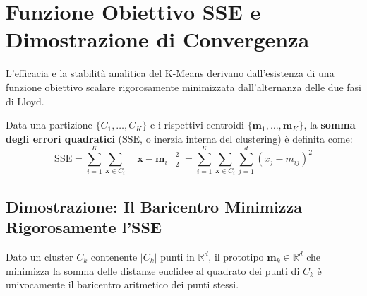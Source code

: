 \FloatBarrier
\section{Funzione Obiettivo SSE e Dimostrazione di Convergenza}
\label{sec:dm-kmeans-sse-convergence}

L'efficacia e la stabilità analitica del K-Means derivano dall'esistenza di una funzione obiettivo scalare rigorosamente minimizzata dall'alternanza delle due fasi di Lloyd.

\begin{definition}
Data una partizione $\{C_1, \dots, C_K\}$ e i rispettivi centroidi $\{\mathbf{m}_1, \dots, \mathbf{m}_K\}$, la \textbf{somma degli errori quadratici} ($\mathrm{SSE}$, o inerzia interna del clustering) è definita come:
\begin{equation}
    \mathrm{SSE} = \sum_{i=1}^K \sum_{\mathbf{x} \in C_i} \|\mathbf{x} - \mathbf{m}_i\|_2^2 = \sum_{i=1}^K \sum_{\mathbf{x} \in C_i} \sum_{j=1}^d (x_j - m_{ij})^2
    \label{eq:dm-sse-definition}
\end{equation}
\end{definition}

\FloatBarrier
\subsection{Dimostrazione: Il Baricentro Minimizza Rigorosamente l'SSE}

\begin{theorem}
Dato un cluster $C_k$ contenente $|C_k|$ punti in $\mathbb{R}^d$, il prototipo $\mathbf{m}_k \in \mathbb{R}^d$ che minimizza la somma delle distanze euclidee al quadrato dei punti di $C_k$ è univocamente il baricentro aritmetico dei punti stessi.
\end{theorem}

